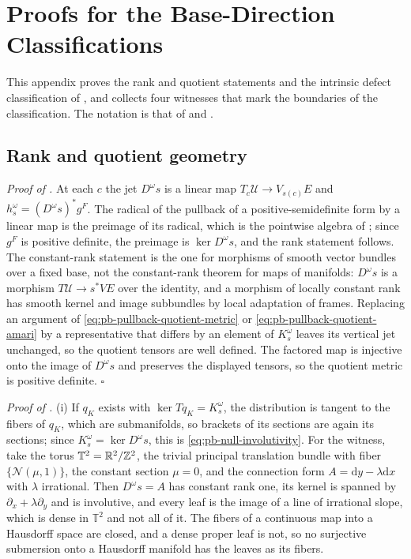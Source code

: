 \chapter{Proofs for the Base-Direction Classifications}
\label{app:base-proofs}

This appendix proves the rank and quotient statements and the intrinsic defect classification of
, and collects four witnesses that mark the boundaries of the
classification. The notation is that of  and
.

\section{Rank and quotient geometry}
\label{sec:app-base-rank-quotient}

\noindent\emph{Proof of .}
At each \(c\) the jet \(D^\omega s\) is a linear map \(T_c\mathcal U\to V_{s(c)}E\) and
\(h_s^\omega=(D^\omega s)^*g^F\). The radical of the pullback of a positive-semidefinite form by a
linear map is the preimage of its radical, which is the pointwise algebra of
; since \(g^F\) is positive definite, the preimage is
\(\ker D^\omega s\), and the rank statement follows. The constant-rank statement is the one for
morphisms of smooth vector bundles over a fixed base, not the constant-rank theorem for maps of
manifolds: \(D^\omega s\) is a morphism \(T\mathcal U\to s^*VE\) over the identity, and a morphism of
locally constant rank has smooth kernel and image subbundles by local adaptation of frames. Replacing
an argument of \eqref{eq:pb-pullback-quotient-metric} or \eqref{eq:pb-pullback-quotient-amari} by a
representative that differs by an element of \(K_s^\omega\) leaves its vertical jet unchanged, so the
quotient tensors are well defined. The factored map is injective onto the image of \(D^\omega s\) and
preserves the displayed tensors, so the quotient metric is positive definite. \hfill$\square$

\noindent\emph{Proof of .}
(i) If \(q_K\) exists with \(\ker Tq_K=K_s^\omega\), the distribution is tangent to the fibers of
\(q_K\), which are submanifolds, so brackets of its sections are again its sections; since
\(K_s^\omega=\ker D^\omega s\), this is \eqref{eq:pb-null-involutivity}. For the witness, take the
torus \(\mathbb T^2=\mathbb R^2/\mathbb Z^2\), the trivial principal translation bundle with fiber
\(\{\mathcal N(\mu,1)\}\), the constant section \(\mu=0\), and the connection form
\(A=\mathrm dy-\lambda\mathrm dx\) with \(\lambda\) irrational. Then \(D^\omega s=A\) has constant
rank one, its kernel is spanned by \(\partial_x+\lambda\partial_y\) and is involutive, and every leaf
is the image of a line of irrational slope, which is dense in \(\mathbb T^2\) and not all of it. The
fibers of a continuous map into a Hausdorff space are closed, and a dense proper leaf is not, so no
surjective submersion onto a Hausdorff manifold has the leaves as its fibers.

